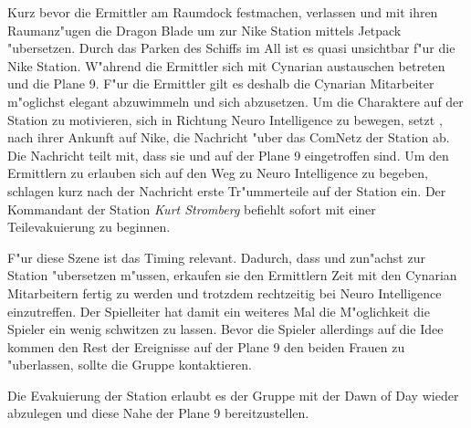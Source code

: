 Kurz bevor die Ermittler am Raumdock festmachen, verlassen \xl{} und \ml{} mit ihren Raumanz"ugen die Dragon Blade um zur Nike Station mittels Jetpack "ubersetzen. Durch das Parken des Schiffs im All ist es quasi unsichtbar f"ur die Nike Station. W"ahrend die Ermittler sich mit Cynarian austauschen betreten \xl{} und \ml{} die Plane 9. F"ur die Ermittler gilt es deshalb die Cynarian Mitarbeiter m"oglichst elegant abzuwimmeln und sich abzusetzen. Um die Charaktere auf der Station zu motivieren, sich in Richtung Neuro Intelligence zu bewegen, setzt \ml{}, nach ihrer Ankunft auf Nike, die Nachricht  "uber das ComNetz der Station ab. Die Nachricht teilt mit, dass sie und \xl{} auf der Plane 9 eingetroffen sind. Um den Ermittlern zu erlauben sich auf den Weg zu Neuro Intelligence zu begeben, schlagen kurz nach der Nachricht erste Tr"ummerteile auf der Station ein. Der Kommandant der Station \emph{Kurt Stromberg} befiehlt sofort mit einer Teilevakuierung zu beginnen.

\begin{remarks}
	F"ur diese Szene ist das Timing relevant. Dadurch, dass \xl{} und \ml{} zun"achst zur Station "ubersetzen m"ussen, erkaufen sie	den Ermittlern Zeit mit den Cynarian Mitarbeitern fertig zu werden und trotzdem rechtzeitig bei Neuro Intelligence einzutreffen. Der Spielleiter hat damit ein weiteres Mal die M"oglichkeit die Spieler ein wenig schwitzen zu lassen. Bevor die Spieler allerdings auf die Idee kommen den Rest der Ereignisse auf der Plane 9 den beiden Frauen zu "uberlassen, sollte \ml{} die Gruppe kontaktieren.

	Die Evakuierung der Station erlaubt es der Gruppe mit der Dawn of Day wieder abzulegen und diese Nahe der Plane 9 bereitzustellen.	
\end{remarks}
